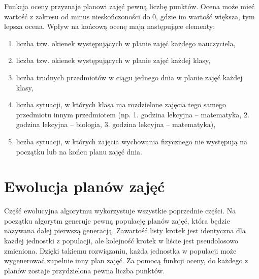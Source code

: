     Funkcja oceny przyznaje planowi zajęć pewną liczbę punktów. Ocena może mieć wartość z zakresu od minus nieskończoności do 0, gdzie im wartość większa, tym lepsza ocena.
    Wpływ na końcową ocenę mają następujące elementy:
\begin{enumerate}
	\item liczba tzw. okienek występujących w planie zajęć każdego nauczyciela,
	\item liczba tzw. okienek występujących w planie zajęć każdej klasy,
	\item liczba trudnych przedmiotów w ciągu jednego dnia w planie zajęć każdej klasy,
	\item liczba sytuacji, w których klasa ma rozdzielone zajęcia tego samego przedmiotu innym przedmiotem (np. 1. godzina lekcyjna -- matematyka, 2. godzina lekcyjna -- biologia, 3. godzina lekcyjna -- matematyka),
	\item liczba sytuacji, w których zajęcia wychowania fizycznego nie występują na początku lub na końcu planu zajęć dnia.
\end{enumerate}


\section{Ewolucja planów zajęć}

    Część ewolucyjna algorytmu wykorzystuje wszystkie poprzednie części. Na początku algorytm generuje pewną populację planów zajęć, która będzie nazywana dalej pierwszą generacją. Zawartość listy krotek jest identyczna dla każdej jednostki z populacji, ale kolejność krotek w liście jest pseudolosowo zmieniona. Dzięki takiemu rozwiązaniu, każda jednostka w populacji może wygenerować zupełnie inny plan zajęć. Za pomocą funkcji oceny, do każdego z planów zostaje przydzielona pewna liczba punktów. 
    
